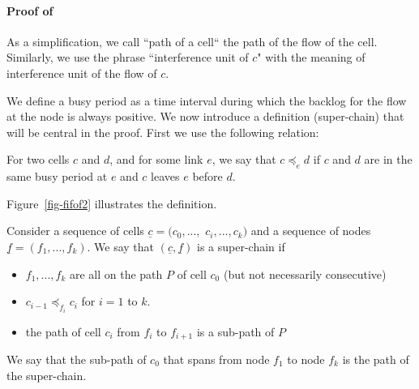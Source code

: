 \paragraph{Proof of }  As a
simplification, we call ``path of a cell``  the path of the flow
of the cell. Similarly, we use the phrase ``interference unit of
$c$" with the meaning of interference unit of the flow of $c$.

We define a busy period as a time interval during which the
backlog for the flow at the node is always positive. We now
introduce a definition (super-chain) that will be central in the
proof. First we use the following relation:
%
%
\begin{definition}
 For two cells $c$ and $d$, and for
some link $e$, we say that $c \preccurlyeq_e d$ if $c$ and $d$ are
in the same busy period at $e$ and $c$ leaves $e$ before $d$.
\end{definition}
Figure~\ref{fig-fifof2} illustrates the definition.
\begin{figure}
\end{figure}
\begin{definition}
Consider a sequence of cells $\underline{c}=(c_0, ...,$ $c_i, ...,
c_k)$ and a sequence of nodes $\underline{f}=(f_1, ...,f_k)$. We
say that $(\underline{c}, \underline{f})$ is a super-chain if
\begin{itemize}
  \item $f_1, ..., f_k$ are all on the
  path $P$
   of cell $c_0$ (but not necessarily consecutive)
   \item
 $c_{i-1}\preccurlyeq_{f_i} c_i$ for $i=1$ to $k$.
  \item the path of cell $c_i$ from $f_i$ to $f_{i+1}$ is a sub-path of $P$
\end{itemize}
\end{definition}
We say that the sub-path of $c_0$ that spans from node $f_1$ to
node $f_k$ is the path of the super-chain.


